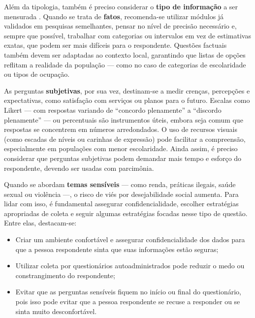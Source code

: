 \documentclass[12pt, a4paper, openany]{book}
\begin{document}
Al\'em da tipologia, tamb\'em \'e preciso considerar o \textbf{tipo de informa\c{c}\~ao} a ser mensurada \citep{kopper2020survey}. Quando se trata de \textbf{fatos}, recomenda-se utilizar m\'odulos j\'a validados em pesquisas semelhantes, pensar no n\'ivel de precis\~ao necess\'ario e, sempre que poss\'ivel, trabalhar com categorias ou intervalos em vez de estimativas exatas, que podem ser mais dif\'iceis para o respondente. Quest\~oes factuais tamb\'em devem ser adaptadas ao contexto local, garantindo que listas de op\c{c}\~oes reflitam a realidade da popula\c{c}\~ao --- como no caso de categorias de escolaridade ou tipos de ocupa\c{c}\~ao.

As perguntas \textbf{subjetivas}, por sua vez, destinam-se a medir cren\c{c}as, percep\c{c}\~oes e expectativas, como satisfa\c{c}\~ao com servi\c{c}os ou planos para o futuro. Escalas como Likert --- com respostas variando de ``concordo plenamente'' a ``discordo plenamente'' --- ou percentuais s\~ao instrumentos \'uteis, embora seja comum que respostas se concentrem em n\'umeros arredondados. O uso de recursos visuais (como escadas de n\'iveis ou carinhas de express\~ao) pode facilitar a compreens\~ao, especialmente em popula\c{c}\~oes com menor escolaridade. Ainda assim, \'e preciso considerar que perguntas subjetivas podem demandar mais tempo e esfor\c{c}o do respondente, devendo ser usadas com parcim\^onia.

Quando se abordam \textbf{temas sens\'iveis} --- como renda, pr\'aticas ilegais, sa\'ude sexual ou viol\^encia ---, o risco de vi\'es por desejabilidade social aumenta. Para lidar com isso, \'e fundamental assegurar confidencialidade, escolher estrat\'egias apropriadas de coleta e seguir algumas estrat\'egias focadas nesse tipo de quest\~ao. Entre elas, destacam-se:

\begin{itemize}
\item Criar um ambiente confort\'avel e assegurar confidencialidade dos dados para que a pessoa respondente sinta que suas informa\c{c}\~oes est\~ao seguras;
\item Utilizar coleta por question\'arios autoadministrados pode reduzir o medo ou constrangimento do respondente;
\item Evitar que as perguntas sens\'iveis fiquem no in\'icio ou final do question\'ario, pois isso pode evitar que a pessoa respondente se recuse a responder ou se sinta muito desconfort\'avel.
\end{itemize}
\end{document}
